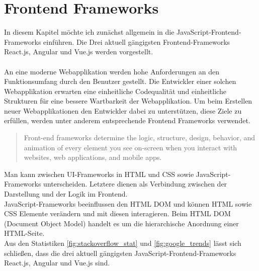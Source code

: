 %

\chapter{Frontend Frameworks}

In diesem Kapitel möchte ich zunächst allgemein in die JavaScript-Frontend-Frameworks einführen.
Die Drei aktuell gängigsten Frontend-Frameworks React.js, Angular und Vue.js werden vorgestellt.
\\
\\
An eine moderne Webapplikation werden hohe Anforderungen an den Funktionsumfang durch den Benutzer gestellt.
Die Entwickler einer solchen Webapplikation erwarten eine einheitliche Codequalität und einheitliche Strukturen
für eine bessere Wartbarkeit der Webapplikation.
Um beim Erstellen neuer Webapplikationen den Entwickler dabei zu unterstützen, diese Ziele zu erfüllen,
werden unter anderem entsprechende Frontend Frameworks verwendet.
\begin{quote}
    Front-end frameworks determine the logic, structure, design, behavior,
    and animation of every element you see on-screen when you interact with websites,
    web applications, and mobile apps. \cite{sigdestad22}
\end{quote}
Man kann zwischen UI-Frameworks in HTML und CSS sowie JavaScript-Frameworks unterscheiden.
Letztere dienen als Verbindung zwischen der Darstellung und der Logik im Frontend.
\\
JavaScript-Frameworks beeinflussen den HTML DOM und können HTML sowie CSS Elemente verändern und mit diesen interagieren.
Beim HTML DOM (Document Object Model) handelt es um die hierarchische Anordnung einer HTML-Seite. \cite[S. 26-27]{steyer2019}%
\\
Aus den Statistiken \ref{fig:stackoverflow_stat} und \ref{fig:google_trends} lässt sich schließen,
dass die drei aktuell gängigsten JavaScript-Frontend-Frameworks React.js, Angular und Vue.js sind.

